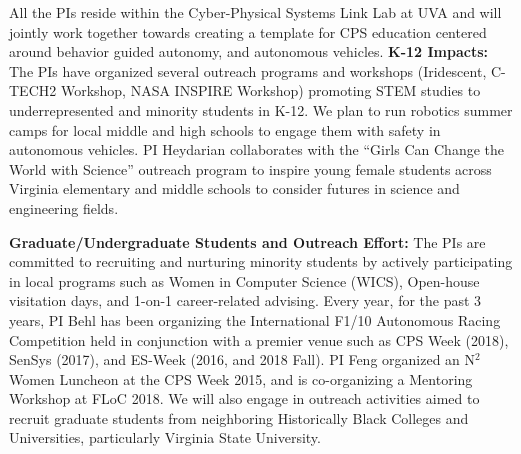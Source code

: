 All the PIs reside within the Cyber-Physical Systems Link Lab at UVA and will jointly work together towards creating a template for CPS education centered around behavior guided autonomy, and autonomous vehicles. 
\newline
\noindent \textbf{K-12 Impacts:}
The PIs have organized several outreach programs and workshops (Iridescent, C-TECH2 Workshop, NASA INSPIRE Workshop) promoting STEM studies to underrepresented and minority students in K-12. 
We plan to run robotics summer camps for local middle and high schools to engage them with safety in autonomous vehicles.
PI Heydarian collaborates with the ``Girls Can Change the World with Science'' outreach program to inspire young female students across Virginia elementary and middle schools to consider futures in science and engineering fields. 

\newline
\noindent \textbf{Graduate/Undergraduate Students and Outreach Effort:}
The PIs are committed to recruiting and nurturing minority students by actively participating in local programs such as Women in Computer Science (WICS),  Open-house visitation days, and 1-on-1 career-related advising.
Every year, for the past 3 years, PI Behl has been organizing the International F1/10 Autonomous Racing Competition held in conjunction with a premier venue such as CPS Week (2018), SenSys (2017), and ES-Week (2016, and 2018 Fall).
PI Feng organized an N$^2$Women Luncheon at the CPS Week 2015, and is co-organizing a Mentoring Workshop at FLoC 2018. 
We will also engage in outreach activities aimed to recruit graduate students from neighboring Historically Black Colleges and Universities, particularly Virginia State University.

